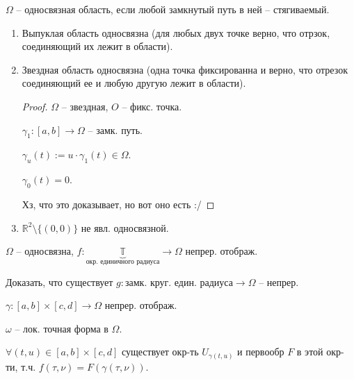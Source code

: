 \begin{definition}
    $\Omega$ -- односвязная область, если любой замкнутый путь в ней -- стягиваемый. 
\end{definition}
\begin{example}
    \begin{enumerate}
        \item {
            Выпуклая область односвязна (для любых двух точке верно, что отрзок, соединяющий их лежит в области).
        }
        \item {
            Звездная область односвязна (одна точка фиксированна и верно, что отрезок соединяющий ее и любую другую лежит в области).
            \begin{proof}
                $\Omega$ -- звездная, $O$ -- фикс. точка.

                $\gamma_1: [a, b] \rightarrow \Omega$ -- замк. путь.

                $\gamma_u(t) := u \cdot \gamma_1(t) \in \Omega$.

                $\gamma_0(t) = 0$.

                Хз, что это доказывает, но вот оно есть :/
            \end{proof}
        }
        \item {
            $\mathbb{R}^2 \setminus \{ (0, 0) \}$ не явл. односвязной.
        }
    \end{enumerate}
\end{example}

\begin{exerc}
    $\Omega$ -- односвязна, $f: \underbrace{\mathbb{T}}_{\text{окр. единичного радиуса}} \rightarrow \Omega$ непрер. отображ.

    Доказать, что существует $g: \text{замк. круг. един. радиуса} \rightarrow \Omega$ -- непрер.
\end{exerc}

\begin{definition}
    $\gamma: [a, b] \times [c, d] \rightarrow \Omega$ непрер. отображ.
    
    $\omega$ -- лок. точная форма в $\Omega$.

    $\forall (t, u) \in [a, b] \times [c, d]$ существует окр-ть $U_{\gamma(t, u)}$ и первообр $F$ в этой окр-ти, т.ч. $f(\tau, \nu) = F(\gamma(\tau, \nu))$.
\end{definition}

